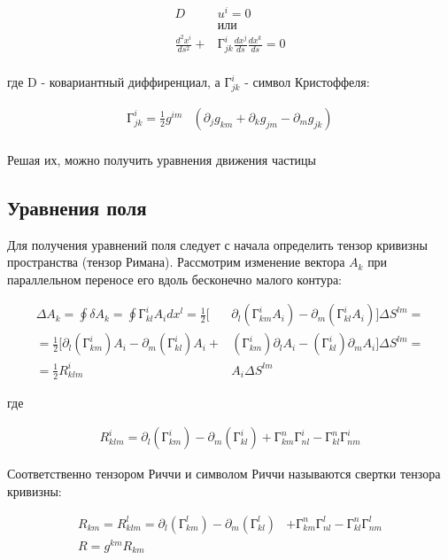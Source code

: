 \documentclass{article}
\begin{document}
		\begin{align*}
			D & u^i = 0 \\
			& или      \\
			\frac{d^2 x^i}{ds^2} + & Г_{jk}^i \frac{dx^j}{ds} \frac{dx^k}{ds} = 0 \\
		\end{align*}

		где D - ковариантный диффиренциал, а $ Г_{jk}^i $ - символ Кристоффеля: 

		\begin{align*}
			Г_{jk}^i = \frac{1}{2} g^{im} & ( \partial_{j} g_{km} + \partial_{k} g_{jm} - \partial_{m} g_{jk} ) \\
		\end{align*}

		Решая их, можно получить уравнения движения частицы

	\subsection{Уравнения поля}	
		
		Для получения уравнений поля следует с начала определить тензор кривизны пространства (тензор Римана). Рассмотрим изменение вектора $ A_k $ при параллельном переносе его вдоль бесконечно малого контура:

		\begin{align*}
			\Delta A_k = \oint \delta A_k = \oint Г_{kl}^i A_i dx^l 
			= \frac{1}{2} [ & \partial_l (Г_{km}^i A_i) - \partial_m (Г_{kl}^i A_i)] \Delta S^{lm} = \\
			= \frac{1}{2} [   \partial_l (Г_{km}^i) A_i - \partial_m (Г_{kl}^i) A_i + & (Г_{km}^i) \partial_l A_i - (Г_{kl}^i) \partial_m A_i ] \Delta S^{lm} = \\
			= \frac{1}{2} R^i_{klm} & A_i \Delta S^{lm}
		\end{align*}

		где 

		\begin{align*}
			R^i_{klm} = \partial_l (Г_{km}^i) - \partial_m (Г_{kl}^i)  + Г_{km}^n Г_{nl}^i - Г_{kl}^n Г_{nm}^i
		\end{align*}

		Соответственно тензором Риччи и символом Риччи называются свертки тензора кривизны:

		\begin{align*}
			R_{km} = R^l_{klm} = \partial_l (Г_{km}^l) - \partial_m (Г_{kl}^l) & + Г_{km}^n Г_{nl}^l - Г_{kl}^n Г_{nm}^l \\
			R  = g^{km} R_{km} &
		\end{align*}
\end{document}
